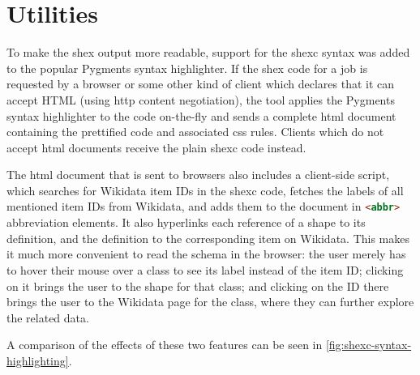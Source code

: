 \section{Utilities} %
\label{sec:wdsi:utilities}

To make the \gls{shex} output more readable,
support for the \gls{shexc} syntax was added to the popular Pygments syntax highlighter. %
If the \gls{shex} code for a \gls{job}
is requested by a browser
or some other kind of client which declares that it can accept HTML
(using \gls{http} content negotiation),
the tool applies the Pygments syntax highlighter to the code on-the-fly
and sends a complete \gls{html} document containing the prettified code and associated \gls{css} rules.
Clients which do not accept \gls{html} documents receive the plain \gls{shexc} code instead.

The \gls{html} document that is sent to browsers
also includes a client-side script,
which searches for \gls{Wikidata} \glspl{item ID} in the \gls{shexc} code,
fetches the \glspl{label} of all mentioned \glspl{item ID} from \gls{Wikidata},
and adds them to the document in \lstinline[language=html]{<abbr>} abbreviation elements.
It also hyperlinks each reference of a \gls{shape} to its definition,
and the definition to the corresponding \gls{item} on \gls{Wikidata}.
This makes it much more convenient to read the \gls{schema} in the browser:
the user merely has to hover their mouse over a class to see its \gls{label} instead of the \gls{item ID};
clicking on it brings the user to the \gls{shape} for that class;
and clicking on the ID there brings the user to the \gls{Wikidata} page for the class,
where they can further explore the related data.

A comparison of the effects of these two features
can be seen in \cref{fig:shexc-syntax-highlighting}.

